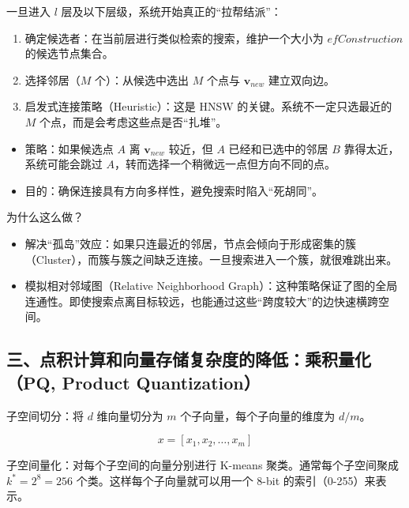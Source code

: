 一旦进入 \(l\) 层及以下层级，系统开始真正的``拉帮结派''：

\begin{enumerate}
\def\labelenumi{\arabic{enumi}.}
\item
  确定候选者：在当前层进行类似检索的搜索，维护一个大小为 \(efConstruction\) 的候选节点集合。
\item
  选择邻居（\(M\) 个）：从候选中选出 \(M\) 个点与 \(\mathbf{v}_{new}\) 建立双向边。
\item
  启发式连接策略（Heuristic）：这是 HNSW 的关键。系统不一定只选最近的 \(M\) 个点，而是会考虑这些点是否``扎堆''。
\end{enumerate}

\begin{itemize}
\tightlist
\item
  策略：如果候选点 \(A\) 离 \(\mathbf{v}_{new}\) 较近，但 \(A\) 已经和已选中的邻居 \(B\) 靠得太近，系统可能会跳过 \(A\)，转而选择一个稍微远一点但方向不同的点。
\item
  目的：确保连接具有方向多样性，避免搜索时陷入``死胡同''。
\end{itemize}

为什么这么做？

\begin{itemize}
\tightlist
\item
  解决``孤岛''效应：如果只连最近的邻居，节点会倾向于形成密集的簇（Cluster），而簇与簇之间缺乏连接。一旦搜索进入一个簇，就很难跳出来。
\item
  模拟相对邻域图（Relative Neighborhood Graph）：这种策略保证了图的全局连通性。即使搜索点离目标较远，也能通过这些``跨度较大''的边快速横跨空间。
\end{itemize}

\hypertarget{ux4e09ux70b9ux79efux8ba1ux7b97ux548cux5411ux91cfux5b58ux50a8ux590dux6742ux5ea6ux7684ux964dux4f4eux4e58ux79efux91cfux5316pq-product-quantization}{%
\subsection{三、点积计算和向量存储复杂度的降低：乘积量化（PQ, Product Quantization）}\label{ux4e09ux70b9ux79efux8ba1ux7b97ux548cux5411ux91cfux5b58ux50a8ux590dux6742ux5ea6ux7684ux964dux4f4eux4e58ux79efux91cfux5316pq-product-quantization}}

子空间切分：将 \(d\) 维向量切分为 \(m\) 个子向量，每个子向量的维度为 \(d/m\)。

\[
x=[x_1,x_2,\ldots,x_m]
\]

子空间量化：对每个子空间的向量分别进行 K-means 聚类。通常每个子空间聚成 \(k^*=2^8=256\) 个类。这样每个子向量就可以用一个 8-bit 的索引（0-255）来表示。

